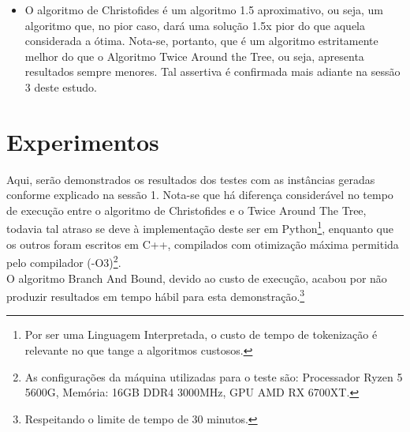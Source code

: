 \documentclass{article}
\begin{document}
\begin{itemize}
    \begin{itemize}
        \item O algoritmo de Christofides é um algoritmo 1.5 aproximativo, ou seja, um algoritmo que, no pior caso, dará uma solução 1.5x pior do que aquela considerada a ótima. Nota-se, portanto, que é um algoritmo estritamente melhor do que o Algoritmo Twice Around the Tree, ou seja, apresenta resultados sempre menores. Tal assertiva é confirmada mais adiante na sessão 3 deste estudo.
    \end{itemize}
\end{itemize}

\section{Experimentos}
Aqui, serão demonstrados os resultados dos testes com as instâncias geradas conforme explicado na sessão 1. Nota-se que há diferença considerável no tempo de execução entre o algoritmo de Christofides e o Twice Around The Tree, todavia tal atraso se deve à implementação deste ser em Python\footnote{Por ser uma Linguagem Interpretada, o custo de tempo de tokenização é relevante no que tange a algoritmos custosos.}, enquanto que os outros foram escritos em C++, compilados com otimização máxima permitida pelo compilador (-O3)\footnote{As configurações da máquina utilizadas para o teste são: Processador Ryzen 5 5600G, Memória: 16GB DDR4 3000MHz, GPU AMD RX 6700XT.}. \\
O algoritmo Branch And Bound, devido ao custo de execução, acabou por não produzir resultados em tempo hábil para esta demonstração.\footnote{Respeitando o limite de tempo de 30 minutos.}
\end{document}
